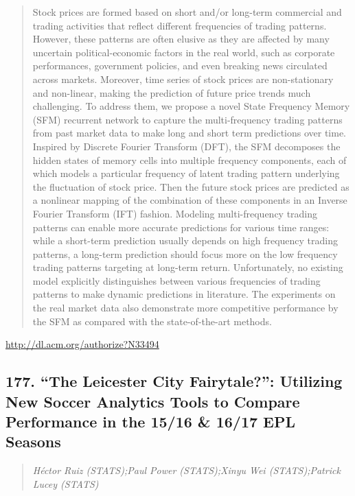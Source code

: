 \documentclass{article}
\begin{document}
\begin{quote}
Stock prices are formed based on short and/or long-term commercial and trading activities that reflect different frequencies of trading patterns. However, these patterns are often elusive as they are affected by many uncertain political-economic factors in the real world, such as corporate performances, government policies, and even breaking news circulated across markets. Moreover, time series of stock prices are non-stationary and non-linear, making the prediction of future price trends much challenging. To address them, we propose a novel State Frequency Memory (SFM) recurrent network to capture the multi-frequency trading patterns from past market data to make long and short term predictions over time. Inspired by Discrete Fourier Transform (DFT), the SFM decomposes the hidden states of memory cells into multiple frequency components, each of which models a particular frequency of latent trading pattern underlying the fluctuation of stock price. Then the future stock prices are predicted as a nonlinear mapping of the combination of these components in an Inverse Fourier Transform (IFT) fashion. Modeling multi-frequency trading patterns can enable more accurate predictions for various time ranges: while a short-term prediction usually depends on high frequency trading patterns, a long-term prediction should focus more on the low frequency trading patterns targeting at long-term return. Unfortunately, no existing model explicitly distinguishes between various frequencies of trading patterns to make dynamic predictions in literature. The experiments on the real market data also demonstrate more competitive performance by the SFM as compared with the state-of-the-art methods.
\end{quote}

\href{http://dl.acm.org/authorize?N33494}{http://dl.acm.org/authorize?N33494}

\subsection{177. “The Leicester City Fairytale?”: Utilizing New Soccer Analytics Tools to Compare Performance in the 15/16 \& 16/17 EPL Seasons}

\begin{quote}
\footnotesize{\textit{Héctor Ruiz (STATS);Paul Power (STATS);Xinyu Wei (STATS);Patrick Lucey (STATS)}}

\end{quote}
\end{document}
